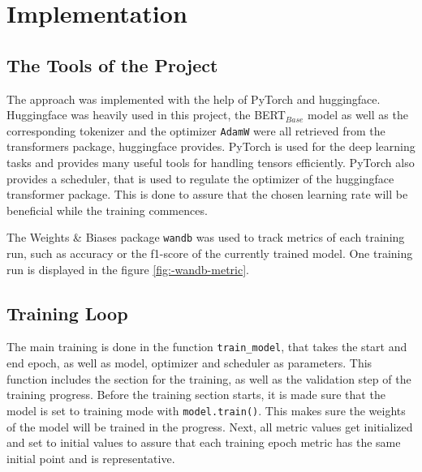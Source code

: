                
\pagebreak
    \section{Implementation}
    \label{sec:implementation}
            

        \subsection{The Tools of the Project}
        \label{sec:-tools-of-the-project}
            The approach was implemented with the help of PyTorch and huggingface.
            Huggingface was heavily used in this project, the BERT$_{Base}$ model as well as the corresponding tokenizer and the optimizer \texttt{AdamW} were all retrieved from the transformers package, huggingface provides. 
            PyTorch is used for the deep learning tasks and provides many useful tools for handling tensors efficiently. 
            PyTorch also provides a scheduler, that is used to regulate the optimizer of the huggingface transformer package.
            This is done to assure that the chosen learning rate will be beneficial while the training commences.

            The Weights \& Biases package \texttt{wandb} was used to track metrics of each training run, such as accuracy or the f1-score of the currently trained model.
            One training run is displayed in the figure \ref{fig:-wandb-metric}.

        \subsection{Training Loop}
        \label{sec:-training-loop}
            The main training is done in the function \texttt{train\_model}, that takes the start and end epoch, as well as model, optimizer and scheduler as parameters.
            This function includes the section for the training, as well as the validation step of the training progress.
            Before the training section starts, it is made sure that the model is set to training mode with \texttt{model.train()}. This makes sure the weights of the model will be trained in the progress.
            Next, all metric values get initialized and set to initial values to assure that each training epoch metric has the same initial point and is representative.

